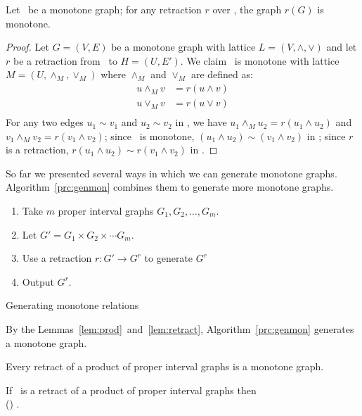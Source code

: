 \begin{lemma}
Let \mG\ be a monotone graph; for any retraction \(r\) over \mG, the graph
\(r(G)\) is monotone.
\end{lemma}

\begin{proof}
Let \(G=(V,E)\) be a monotone graph with lattice \(L=(V, \wedge,\vee)\) and
let \(r\) be a retraction from \mG\ to \(H=(U,E')\)\@. We claim
\mH\ is monotone with lattice \(M=(U,\wedge_M, \vee_M)\) where
\(\wedge_M\) and \(\vee_M\) are defined as:
\begin{eqnarray*}
u \wedge_M v &= r(u \wedge v) \\
u \vee_M v &= r(u \vee v) \\
\end{eqnarray*}
For any two edges \(u_1 \sim v_1\) and \(u_2 \sim v_2\) in \mH,
we have \(u_1 \wedge_M u_2 = r(u_1 \wedge u_2)\) and \(v_1 \wedge_M v_2 = r(v_1 \wedge v_2)\);
since \mG\ is monotone, \((u_1 \wedge u_2) \sim (v_1 \wedge v_2)\) in \mG;
since \(r\) is a retraction, \(r(u_1 \wedge u_2) \sim r(v_1 \wedge v_2)\) in \mH\@.
\end{proof}

So far we presented several ways in which we can generate monotone graphs.
Algorithm~\ref{prc:genmon} combines them to generate more monotone graphs.
\begin{algorithm}
\begin{enumerate}
\item Take \(m\) proper interval graphs \(G_1,G_2,\dotsc,G_m\)\@.
\item Let \(G' = G_1 \times G_2 \times \dotsb G_m\)\@.
\item Use a retraction \(r:G' \to G^r\) to generate \(G^r\)
\item Output \(G^r\)\@.
\end{enumerate}
\caption{Generating monotone relations}\label{prc:genmon}
\end{algorithm}

By the Lemmas~\ref{lem:prod}~and~\ref{lem:retract}, Algorithm~\ref{prc:genmon} generates a monotone graph.

\begin{cor}
Every retract of a product of proper interval graphs is a monotone graph.
\end{cor}

\begin{cor}
If \mH\ is a retract of a product of proper interval graphs then\\ \chom(\mH) \maple \cbis\@.
\end{cor}

